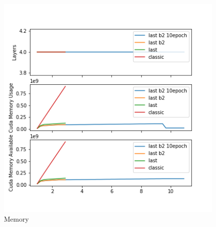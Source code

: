\begin{figure}[H]
\centering
\includegraphics{parts/appendix/reports-gmsnn/docs_esteban-latex/test_reports/2018-06-12/history_memory.png}
\caption{Memory}
\end{figure}

